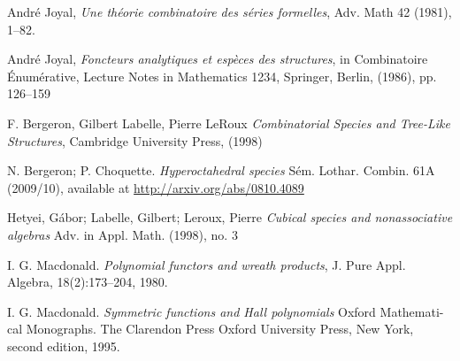 \begin{thebibliography}{9}

 André Joyal, \emph{Une théorie combinatoire des séries
formelles}, Adv. Math 42 (1981), 1–82.

 André Joyal, \emph{Foncteurs analytiques et espèces des
structures}, in Combinatoire Énumérative, Lecture Notes in Mathematics 1234, Springer,
Berlin, (1986), pp. 126–159

 F. Bergeron, Gilbert Labelle, Pierre LeRoux
\emph{Combinatorial Species and Tree-Like Structures}, Cambridge University Press, (1998)

 N. Bergeron; P. Choquette.
\emph{Hyperoctahedral species} Sém. Lothar. Combin. 61A (2009/10), available at
\url{http://arxiv.org/abs/0810.4089}

 Hetyei, Gábor; Labelle, Gilbert;
Leroux, Pierre \emph{Cubical species and nonassociative algebras} Adv. in Appl.
Math. (1998), no. 3

 I. G. Macdonald. \emph{Polynomial functors and wreath
products}, J. Pure Appl. Algebra, 18(2):173–204, 1980.

 I. G. Macdonald. \emph{Symmetric functions and Hall polynomials}
Oxford Mathemati- cal Monographs.
The Clarendon Press Oxford University Press, New York, second edition, 1995.

\end{thebibliography}
